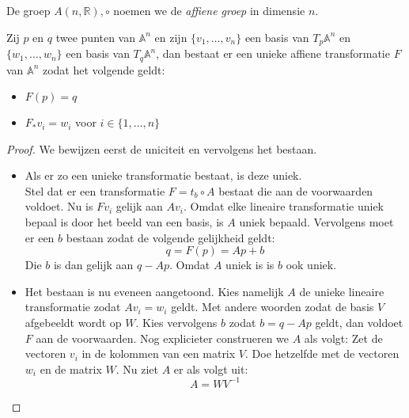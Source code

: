 \documentclass[main.tex]{subfiles}
\begin{document}
\begin{de}
  De groep $A(n,\mathbb{R}),\circ$ noemen we de \emph{affiene groep} in dimensie $n$.
\end{de}

\begin{st}
  \label{st:raakende-ruimtes-transformatie}
  Zij $p$ en $q$ twee punten van $\mathbb{A}^{n}$ en zijn $\{v_{1},\dotsc,v_{n}\}$ een basis van $T_{p}\mathbb{A}^{n}$ en $\{w_{1},\dotsc,w_{n}\}$ een basis van $T_{q}\mathbb{A}^{n}$, dan bestaat er een unieke affiene transformatie $F$ van $\mathbb{A}^{n}$ zodat het volgende geldt:
  \begin{itemize}
  \item $F(p) = q$
  \item $F_{*}v_{i} = w_{i}$ voor $i \in \{ 1,\dotsc,n \}$
  \end{itemize}

  \begin{proof}
    We bewijzen eerst de uniciteit en vervolgens het bestaan.
    \begin{itemize}
    \item Als er zo een unieke transformatie bestaat, is deze uniek.\\
      Stel dat er een transformatie $F = t_{b} \circ A$ bestaat die aan de voorwaarden voldoet.
      Nu is $Fv_{i}$ gelijk aan $Av_{i}$.
      Omdat elke lineaire transformatie uniek bepaal is door het beeld van een basis, is $A$ uniek bepaald.
      Vervolgens moet er een $b$ bestaan zodat de volgende gelijkheid geldt:
      \[ q = F(p) = Ap + b \]
      Die $b$ is dan gelijk aan $q-Ap$.
      Omdat $A$ uniek is is $b$ ook uniek.
    \item
      Het bestaan is nu eveneen aangetoond. 
      Kies namelijk $A$ de unieke lineaire transformatie zodat $Av_{i} = w_{i}$ geldt.
      Met andere woorden zodat de basis $V$ afgebeeldt wordt op $W$.
      Kies vervolgens $b$ zodat $b=q-Ap$ geldt, dan voldoet $F$ aan de voorwaarden.
      Nog explicieter construeren we $A$ als volgt:
      Zet de vectoren $v_{i}$ in de kolommen van een matrix $V$.
      Doe hetzelfde met de vectoren $w_{i}$ en de matrix $W$.
      Nu ziet $A$ er als volgt uit:
      \[ A = WV^{-1} \]
    \end{itemize}
  \end{proof}
\end{st}
\end{document}
